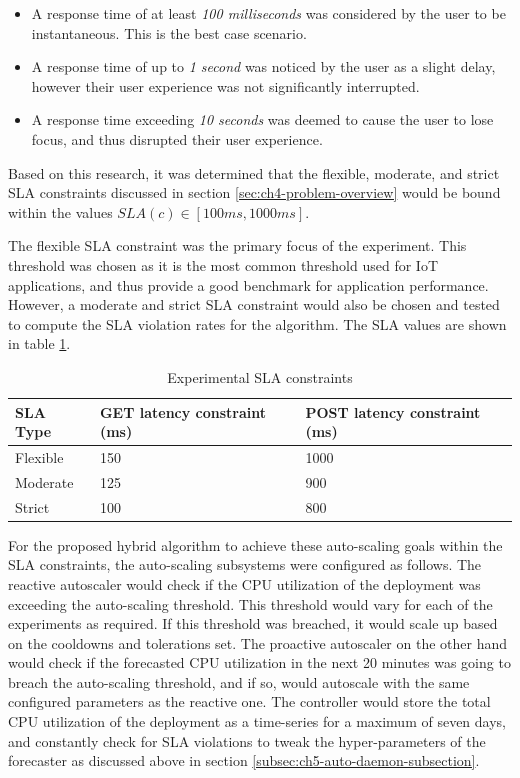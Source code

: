 \begin{itemize}
    \item A response time of at least \textit{100 milliseconds} was considered by the user to be instantaneous. This is the best case scenario.
    \item A response time of up to \textit{1 second} was noticed by the user as a slight delay, however their user experience was not significantly interrupted.
    \item A response time exceeding \textit{10 seconds} was deemed to cause the user to lose focus, and thus disrupted their user experience.
\end{itemize}

Based on this research, it was determined that the flexible, moderate, and strict SLA constraints discussed in section \ref{sec:ch4-problem-overview} would be bound within the values $SLA(c) \in [100ms, 1000ms]$.\par

The flexible SLA constraint was the primary focus of the experiment. This threshold was chosen as it is the most common threshold used for IoT applications, and thus provide a good benchmark for application performance. However, a moderate and strict SLA constraint would also be chosen and tested to compute the SLA violation rates for the algorithm. The SLA values are shown in table \ref{tab:experiment-sla-values}.\par

\begin{table}
    \caption{Experimental SLA constraints}\label{tab:experiment-sla-values}
    \centering
    \begin{tabular}{|l|l|l|}
        \hline
        SLA Type & GET latency constraint (ms) & POST latency constraint (ms)\\
        \hline
        Flexible    & 150   & 1000\\
        Moderate    & 125   & 900\\
        Strict      & 100   & 800\\
        \hline
    \end{tabular}
\end{table}

For the proposed hybrid algorithm to achieve these auto-scaling goals within the SLA constraints, the auto-scaling subsystems were configured as follows. The reactive autoscaler would check if the CPU utilization of the deployment was exceeding the auto-scaling threshold. This threshold would vary for each of the experiments as required. If this threshold was breached, it would scale up based on the cooldowns and tolerations set. The proactive autoscaler on the other hand would check if the forecasted CPU utilization in the next 20 minutes was going to breach the auto-scaling threshold, and if so, would autoscale with the same configured parameters as the reactive one. The controller would store the total CPU utilization of the deployment as a time-series for a maximum of seven days, and constantly check for SLA violations to tweak the hyper-parameters of the forecaster as discussed above in section \ref{subsec:ch5-auto-daemon-subsection}.\par

